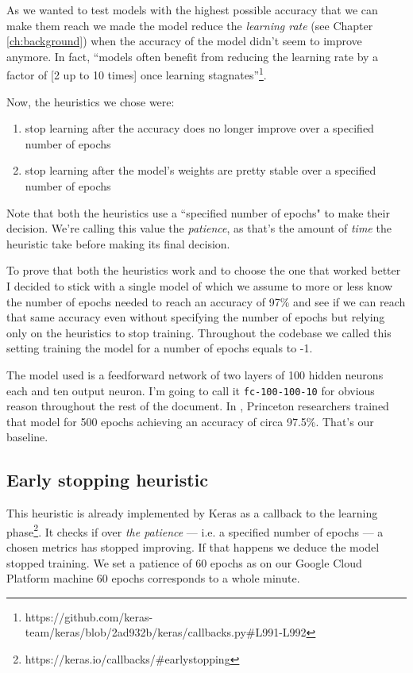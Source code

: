 As we wanted to test models with the highest possible accuracy that we
can make them reach we made the model reduce the \emph{learning rate}
(see Chapter \ref{ch:background}) when the accuracy of the model didn't
seem to improve anymore. In fact, ``models often benefit from reducing
the learning rate by a factor of [2 up to 10 times] once learning
stagnates''\footnote{https://github.com/keras-team/keras/blob/2ad932b/keras/callbacks.py\#L991-L992}.

Now, the heuristics we chose were:
\begin{enumerate}
  \item stop learning after the accuracy does no longer improve over a
    specified number of epochs
  \item stop learning after the model's weights are pretty stable over a
    specified number of epochs
\end{enumerate}

Note that both the heuristics use a ``specified number of epochs" to
make their decision. We're calling this value the \emph{patience}, as
that's the amount of \emph{time} the heuristic take before making its
final decision.

To prove that both the heuristics work and to choose the one that
worked better I decided to stick with a single model of which we assume
to more or less know the number of epochs needed to reach an accuracy
of 97\% and see if we can reach that same accuracy even without
specifying the number of epochs but relying only on the heuristics to
stop training. Throughout the codebase we called this setting training
the model for a number of epochs equals to -1.

The model used is a feedforward network of two layers of 100 hidden
neurons each and ten output neuron. I'm going to call it
\texttt{fc-100-100-10} for obvious reason throughout the rest of the
document. In \cite{bhagoji2018enhancing}, Princeton researchers trained
that model for 500 epochs achieving an accuracy of circa 97.5\%. That's our
baseline.

\subsection{Early stopping heuristic}
This heuristic is already implemented by Keras as a callback to the
learning phase\footnote{https://keras.io/callbacks/\#earlystopping}. It
checks if over \emph{the patience} --- i.e. a specified number of
epochs --- a chosen metrics has stopped improving. If that happens we
deduce the model stopped training. We set a patience of 60 epochs as on
our Google Cloud Platform machine 60 epochs corresponds to a whole
minute.

